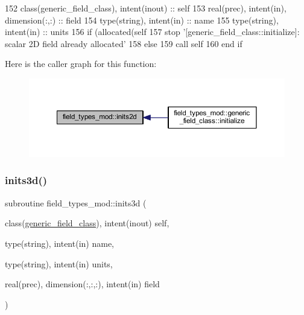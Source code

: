 \begin{DoxyCode}
152     \textcolor{keywordtype}{class}(generic\_field\_class), \textcolor{keywordtype}{intent(inout)} :: self
153     \textcolor{keywordtype}{real(prec)}, \textcolor{keywordtype}{intent(in)}, \textcolor{keywordtype}{dimension(:,:)} :: field
154     \textcolor{keywordtype}{type}(string), \textcolor{keywordtype}{intent(in)} :: name
155     \textcolor{keywordtype}{type}(string), \textcolor{keywordtype}{intent(in)} :: units
156     \textcolor{keywordflow}{if} (\textcolor{keyword}{allocated}(self%
157         stop \textcolor{stringliteral}{'[generic\_field\_class::initialize]: scalar 2D field already allocated'}
158     \textcolor{keywordflow}{else}
159         \textcolor{keyword}{call }self%
160 \textcolor{keywordflow}{    end if}
\end{DoxyCode}
Here is the caller graph for this function\+:
\nopagebreak
\begin{figure}[H]
\begin{center}
\leavevmode
\includegraphics[width=350pt]{namespacefield__types__mod_a55a57c6fa8c785a5f529ca577a677845_icgraph}
\end{center}
\end{figure}
\mbox{\label{namespacefield__types__mod_ac3c3c9514102272c69299be06deabbcd}} 
\subsubsection{\texorpdfstring{inits3d()}{inits3d()}}
{\footnotesize\ttfamily subroutine field\+\_\+types\+\_\+mod\+::inits3d (\begin{DoxyParamCaption}\item[{class(\mbox{\hyperlink{structfield__types__mod_1_1generic__field__class}{generic\+\_\+field\+\_\+class}}), intent(inout)}]{self,  }\item[{type(string), intent(in)}]{name,  }\item[{type(string), intent(in)}]{units,  }\item[{real(prec), dimension(\+:,\+:,\+:), intent(in)}]{field }\end{DoxyParamCaption})\hspace{0.3cm}{\ttfamily [private]}}



